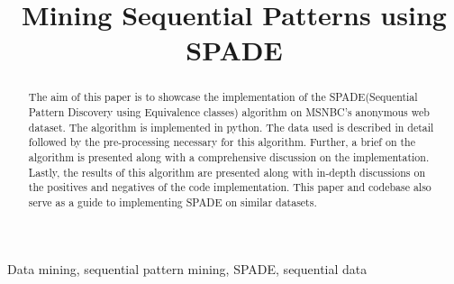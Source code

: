 \documentclass[conference]{IEEEtran}
\begin{document}
\title{Mining Sequential Patterns using SPADE}

\author{
}

\maketitle

\begin{abstract}
    The aim of this paper is to showcase the implementation of the SPADE(Sequential Pattern Discovery using Equivalence classes) algorithm on MSNBC's anonymous web dataset. The algorithm is implemented in python. The data used is described in detail followed by the pre-processing necessary for this algorithm. Further, a brief on the algorithm is presented along with a comprehensive discussion on the implementation. Lastly, the results of this algorithm are presented along with in-depth discussions on the positives and negatives of the code implementation. This paper and codebase also serve as a guide to implementing SPADE on similar datasets.
\end{abstract}

\begin{IEEEkeywords}
    Data mining, sequential pattern mining, SPADE, sequential data
\end{IEEEkeywords}














\end{document}
